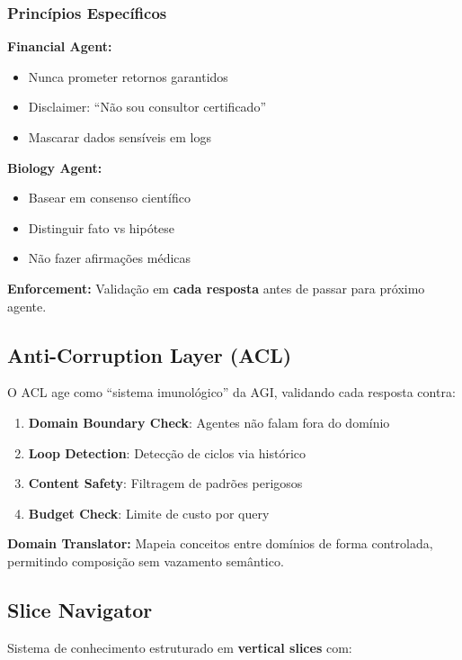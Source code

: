 \documentclass[11pt]{article}
\begin{document}
\subsubsection{Princípios Específicos}

\textbf{Financial Agent:}
\begin{itemize}
    \item Nunca prometer retornos garantidos
    \item Disclaimer: ``Não sou consultor certificado''
    \item Mascarar dados sensíveis em logs
\end{itemize}

\textbf{Biology Agent:}
\begin{itemize}
    \item Basear em consenso científico
    \item Distinguir fato vs hipótese
    \item Não fazer afirmações médicas
\end{itemize}

\textbf{Enforcement:} Validação em \textbf{cada resposta} antes de passar para próximo agente.

\subsection{Anti-Corruption Layer (ACL)}

O ACL age como ``sistema imunológico'' da AGI, validando cada resposta contra:

\begin{enumerate}
    \item \textbf{Domain Boundary Check}: Agentes não falam fora do domínio
    \item \textbf{Loop Detection}: Detecção de ciclos via histórico
    \item \textbf{Content Safety}: Filtragem de padrões perigosos
    \item \textbf{Budget Check}: Limite de custo por query
\end{enumerate}

\textbf{Domain Translator:} Mapeia conceitos entre domínios de forma controlada, permitindo composição sem vazamento semântico.

\subsection{Slice Navigator}

Sistema de conhecimento estruturado em \textbf{vertical slices} com:
\end{document}
